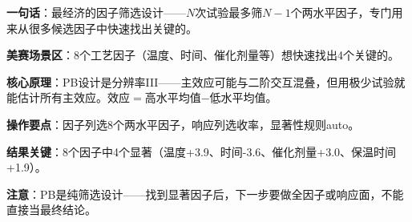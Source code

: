 
\begin{algobrief}
\textbf{一句话}：最经济的因子筛选设计——$N$次试验最多筛$N-1$个两水平因子，专门用来从很多候选因子中快速找出关键的。

\textbf{美赛场景区}：8个工艺因子（温度、时间、催化剂量等）想快速找出4个关键的。

\textbf{核心原理}：PB设计是分辨率III——主效应可能与二阶交互混叠，但用极少试验就能估计所有主效应。效应$=$高水平均值$-$低水平均值。

\textbf{操作要点}：因子列选8个两水平因子，响应列选收率，显著性规则auto。

\textbf{结果关键}：8个因子中4个显著（温度+3.9、时间-3.6、催化剂量+3.0、保温时间+1.9）。

\textbf{注意}：PB是纯筛选设计——找到显著因子后，下一步要做全因子或响应面，不能直接当最终结论。
\end{algobrief}
